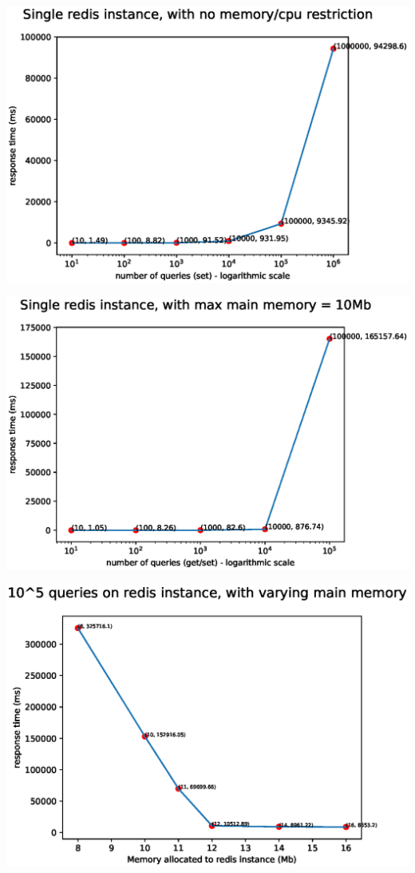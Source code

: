 \documentclass{beamer}
\begin{document}
\begin{frame}
    \includegraphics[width=\textwidth]{fig1.eps}
\end{frame}


\begin{frame}
    \includegraphics[width=\textwidth]{fig2.eps}
\end{frame}


\begin{frame}
    \includegraphics[width=\textwidth]{fig3.eps}
\end{frame}
\end{document}
